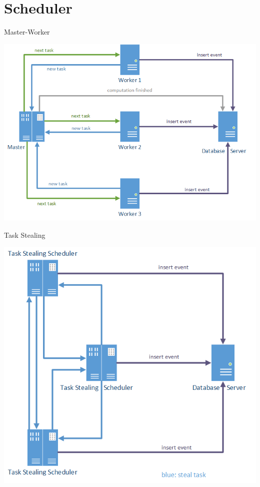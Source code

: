 
\section{Scheduler}

	\begin{frame}{Master-Worker}
		\centerline{\includegraphics[scale=0.5]{images/master}}
	\end{frame}
	\begin{frame}{Task Stealing}
		\centerline{\includegraphics[scale=0.5]{images/taskstealing}}
	\end{frame}

